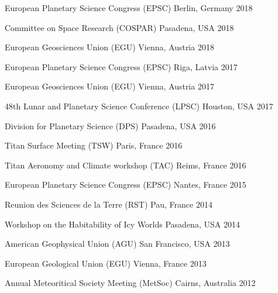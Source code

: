 
\begin{cvhonors}

    \cvhonor
    {European Planetary Science Congress (EPSC)}
    {}
    {Berlin, Germany}
    {2018}

    \cvhonor
    {Committee on Space Research (COSPAR)}
    {}
    {Pasadena, USA}
    {2018}

    \cvhonor
    {European Geosciences Union (EGU)}
    {}
    {Vienna, Austria}
    {2018}

    \cvhonor
    {European Planetary Science Congress (EPSC)}
    {}
    {Riga, Latvia}
    {2017}

  \cvhonor
    {European Geosciences Union (EGU)}
    {}
    {Vienna, Austria}
    {2017}

  \cvhonor
    {48th Lunar and Planetary Science Conference (LPSC)}
    {}
    {Houston, USA}
    {2017}

  \cvhonor
    {Division for Planetary Science (DPS)}
    {}
    {Pasadena, USA}
    {2016}

  \cvhonor
    {Titan Surface Meeting (TSW)}
    {}
    {Paris, France}
    {2016}

  \cvhonor
    {Titan Aeronomy and Climate workshop (TAC)}
    {}
    {Reims, France}
    {2016}

  \cvhonor
    {European Planetary Science Congress (EPSC)}
    {}
    {Nantes, France}
    {2015}

\end{cvhonors}
\begin{cvhonors}

  \cvhonor
    {Reunion des Sciences de la Terre (RST)}
    {}
    {Pau, France}
    {2014}

  \cvhonor
    {Workshop on the Habitability of Icy Worlds}
    {}
    {Pasadena, USA}
    {2014}

  \cvhonor
    {American Geophysical Union (AGU)}
    {}
    {San Francisco, USA}
    {2013}

  \cvhonor
    {European Geological Union (EGU)}
    {}
    {Vienna, France}
    {2013}

  \cvhonor
    {Annual Meteoritical Society Meeting (MetSoc)}
    {}
    {Cairns, Australia}
    {2012}


\end{cvhonors}
